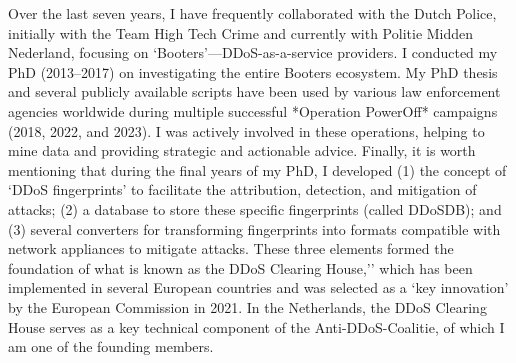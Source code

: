 \documentclass[print]{styles/friggeri-cv-mac} %
\begin{document}
Over the last seven years, I have frequently collaborated with the Dutch Police, initially with the Team High Tech Crime and currently with Politie Midden Nederland, focusing on `Booters'—DDoS-as-a-service providers. I conducted my PhD (2013--2017) on investigating the entire Booters ecosystem. My PhD thesis and several publicly available scripts have been used by various law enforcement agencies worldwide during multiple successful *Operation PowerOff* campaigns (2018, 2022, and 2023). I was actively involved in these operations, helping to mine data and providing strategic and actionable advice.   
% 
\newline   
Finally, it is worth mentioning that during the final years of my PhD, I developed (1) the concept of `DDoS fingerprints' to facilitate the attribution, detection, and mitigation of attacks; (2) a database to store these specific fingerprints (called DDoSDB); and (3) several converters for transforming fingerprints into formats compatible with network appliances to mitigate attacks. These three elements formed the foundation of what is known as the DDoS Clearing House,’’ which has been implemented in several European countries and was selected as a `key innovation’ by the European Commission in 2021. In the Netherlands, the DDoS Clearing House serves as a key technical component of the Anti-DDoS-Coalitie, of which I am one of the founding members.
%
\end{document}
